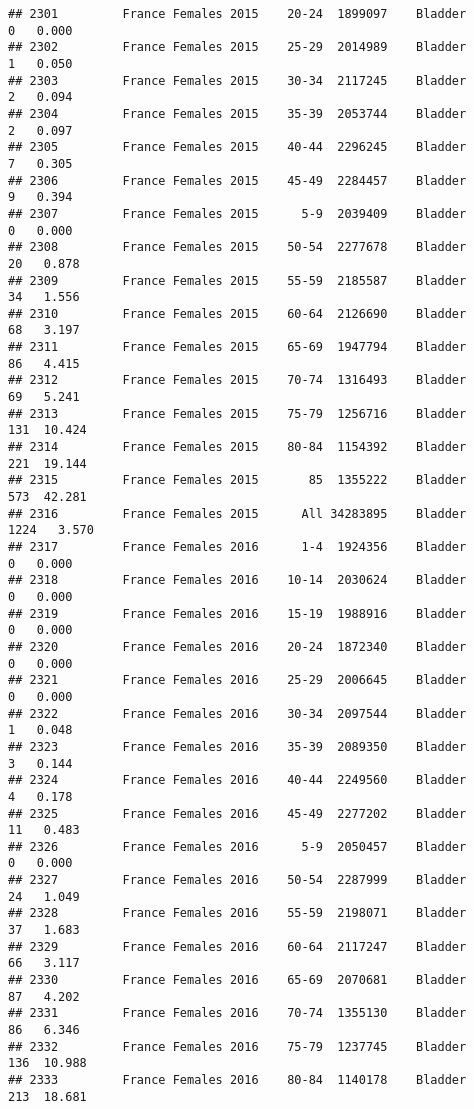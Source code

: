 \documentclass[
]{article}
\begin{document}
\begin{verbatim}
## 2301         France Females 2015    20-24  1899097    Bladder      0   0.000
## 2302         France Females 2015    25-29  2014989    Bladder      1   0.050
## 2303         France Females 2015    30-34  2117245    Bladder      2   0.094
## 2304         France Females 2015    35-39  2053744    Bladder      2   0.097
## 2305         France Females 2015    40-44  2296245    Bladder      7   0.305
## 2306         France Females 2015    45-49  2284457    Bladder      9   0.394
## 2307         France Females 2015      5-9  2039409    Bladder      0   0.000
## 2308         France Females 2015    50-54  2277678    Bladder     20   0.878
## 2309         France Females 2015    55-59  2185587    Bladder     34   1.556
## 2310         France Females 2015    60-64  2126690    Bladder     68   3.197
## 2311         France Females 2015    65-69  1947794    Bladder     86   4.415
## 2312         France Females 2015    70-74  1316493    Bladder     69   5.241
## 2313         France Females 2015    75-79  1256716    Bladder    131  10.424
## 2314         France Females 2015    80-84  1154392    Bladder    221  19.144
## 2315         France Females 2015       85  1355222    Bladder    573  42.281
## 2316         France Females 2015      All 34283895    Bladder   1224   3.570
## 2317         France Females 2016      1-4  1924356    Bladder      0   0.000
## 2318         France Females 2016    10-14  2030624    Bladder      0   0.000
## 2319         France Females 2016    15-19  1988916    Bladder      0   0.000
## 2320         France Females 2016    20-24  1872340    Bladder      0   0.000
## 2321         France Females 2016    25-29  2006645    Bladder      0   0.000
## 2322         France Females 2016    30-34  2097544    Bladder      1   0.048
## 2323         France Females 2016    35-39  2089350    Bladder      3   0.144
## 2324         France Females 2016    40-44  2249560    Bladder      4   0.178
## 2325         France Females 2016    45-49  2277202    Bladder     11   0.483
## 2326         France Females 2016      5-9  2050457    Bladder      0   0.000
## 2327         France Females 2016    50-54  2287999    Bladder     24   1.049
## 2328         France Females 2016    55-59  2198071    Bladder     37   1.683
## 2329         France Females 2016    60-64  2117247    Bladder     66   3.117
## 2330         France Females 2016    65-69  2070681    Bladder     87   4.202
## 2331         France Females 2016    70-74  1355130    Bladder     86   6.346
## 2332         France Females 2016    75-79  1237745    Bladder    136  10.988
## 2333         France Females 2016    80-84  1140178    Bladder    213  18.681

\end{verbatim}
\end{document}
